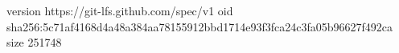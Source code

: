 version https://git-lfs.github.com/spec/v1
oid sha256:5c71af4168d4a48a384aa78155912bbd1714e93f3fca24c3fa05b96627f492ca
size 251748
